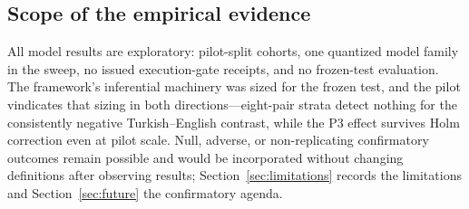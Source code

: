 \subsection{Scope of the empirical evidence}

All model results are exploratory: pilot-split cohorts, one quantized model family in the sweep, no issued
execution-gate receipts, and no frozen-test evaluation. The framework's inferential machinery was sized for
the frozen test, and the pilot vindicates that sizing in both directions---eight-pair strata detect nothing
for the consistently negative Turkish--English contrast, while the P3 effect survives Holm correction even
at pilot scale. Null, adverse, or non-replicating confirmatory outcomes remain possible and would be
incorporated without changing definitions after observing results; Section~\ref{sec:limitations} records
the limitations and Section~\ref{sec:future} the confirmatory agenda.
